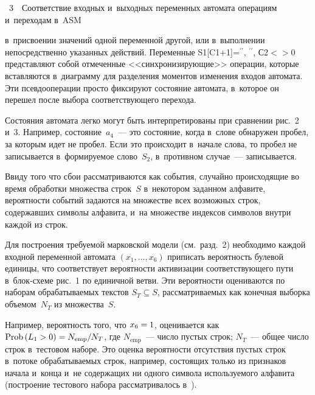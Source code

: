 \begin{multicols}{2}
{                               \vspace*{9pt}
                               
                               \noindent
{{\figurename~3}\ \ \small{Соответствие входных и~выходных переменных автомата операциям и~переходам 
в~ASM}}
}



\noindent
  в~присвоении значений одной переменной другой,
 или в~выполнении 
непосредственно указанных действий. Переменные S1[C1+1]=$^{\prime\prime}$, $^{\prime\prime}$, С2$<>$0 
представляют собой отмеченные <<синхронизи\-ру\-ющие>> операции, которые 
вставляются в~диаграмму для разделения моментов изменения входов 
автомата. Эти псевдооперации просто фиксируют состояние автомата, 
в~которое он перешел после выбора соответствующего перехода.
     
     Состояния автомата легко могут быть интерпретированы при сравнении 
рис.~2 и~3. Например, состояние~$a_4$~--- это состояние, когда в~слове 
обнаружен пробел, за которым идет не пробел. Если это происходит в~начале 
слова, то пробел не записывается в~формируемое слово~$S_2$, в~противном 
случае~--- записывается.
     
     Ввиду того что сбои рассматриваются как события, случайно 
происходящие во время обработки множества строк~$S$ в~некотором 
заданном алфавите, вероятности событий задаются на множестве всех 
возможных строк, содержавших символы алфавита, и~на множестве индексов 
символов внутри каждой из строк. 
     
     Для построения требуемой марковской модели (см.\ разд.~2) необходимо 
каждой входной переменной автомата $(x_1, \ldots, x_6)$ приписать вероятность 
булевой единицы, что соответствует вероятности активизации 
соответствующего пути в~блок-схе\-ме рис.~1 по единичной ветви. Эти 
вероятности оцениваются по наборам обрабатываемых текстов $S_T\subseteq 
S$, рассматриваемых как конечная выборка объемом~$N_T$ из 
множества~$S$.
     
     Например, вероятность того, что $x_6\hm=1$, оценивается как 
$\mathrm{Prob}\,(L_1\hm>0) \hm= N_{\mathrm{emp}}/N_T$, где $N_{\mathrm{emp}}$~--- число пустых 
строк; $N_T$~--- общее число строк в~тес\-то\-вом наборе. Это оценка 
вероятности отсутствия пустых строк в~потоке обрабатываемых строк, 
например, состоящих только из признаков начала и~конца и~не содержащих ни 
одного символа используемого алфавита (построение тестового набора 
рассматривалось в~\cite{4-fr}).
     

\end{multicols}
